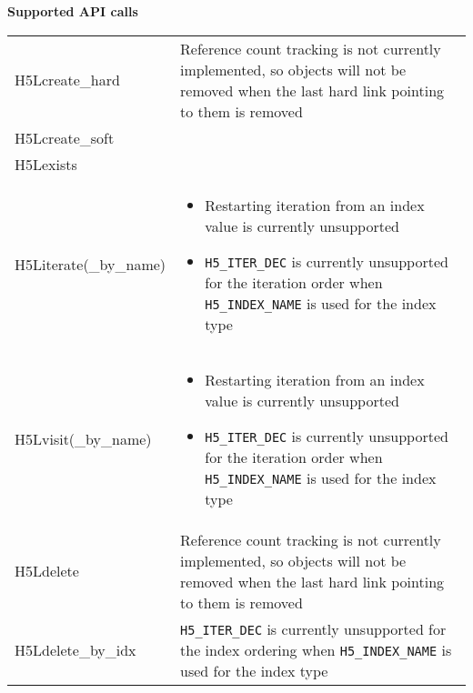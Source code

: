 \documentclass[../users_guide.tex]{subfiles}
\begin{document}
\begin{center}

\textbf{Supported API calls}
\vspace{.2in} \\

\begin{tabularx}{\linewidth}{| X | >{\RaggedRight}X |}
\hline
\rowcolor{lightgray!50}%
\multicolumn{1}{| c |}{\textbf{API call}} & \multicolumn{1}{c |}{\textbf{Notes}} \\ \hline

H5Lcreate\_hard & Reference count tracking is not currently implemented, so objects will not be removed when the last hard link pointing to them is removed\footnotemark[1]\\ \hline
H5Lcreate\_soft & \\ \hline
H5Lexists & \\ \hline
H5Literate(\_by\_name) & \begin{itemize}
                             \item Restarting iteration from an index value is currently unsupported\footnotemark[1]
                             \item \texttt{H5\_ITER\_DEC} is currently unsupported for the iteration order when \texttt{H5\_INDEX\_NAME} is used for the index type
                         \end{itemize}\\ \hline
H5Lvisit(\_by\_name) & \begin{itemize}
                             \item Restarting iteration from an index value is currently unsupported\footnotemark[1]
                             \item \texttt{H5\_ITER\_DEC} is currently unsupported for the iteration order when \texttt{H5\_INDEX\_NAME} is used for the index type
                         \end{itemize}\\ \hline
H5Ldelete & Reference count tracking is not currently implemented, so objects will not be removed when the last hard link pointing to them is removed\footnotemark[1]\\ \hline
H5Ldelete\_by\_idx & \texttt{H5\_ITER\_DEC} is currently unsupported for the index ordering when \texttt{H5\_INDEX\_NAME} is used for the index type\\ \hline

\end{tabularx}


\end{center}
\end{document}
